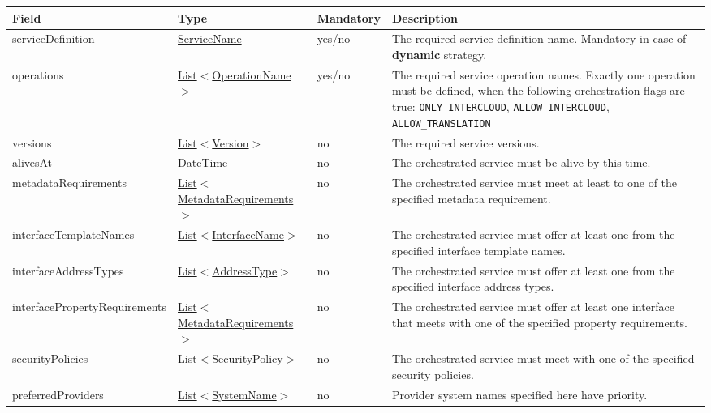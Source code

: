 \documentclass[a4paper]{arrowhead}
\newcommand{\pref}[1]{{\textcolor{ArrowheadGrey}{\hyperref[sec:model:primitives:#1]{#1}}}}
\begin{document}
\begin{table}[ht!]
\begin{tabularx}{\textwidth}{| p{4.8cm} | p{4.7cm} | p{2cm} | X |} \hline
\rowcolor{gray!33} Field & Type & Mandatory & Description \\ \hline
serviceDefinition & \pref{ServiceName} & yes/no & The required service definition name. Mandatory in case of \textbf{dynamic} strategy. \\ \hline
operations & \pref{List}$<$\pref{OperationName}$>$ & yes/no & The required service operation names. \newline 
Exactly one operation must be defined, when the following orchestration flags are true: \newline \texttt{ONLY\_INTERCLOUD}, \texttt{ALLOW\_INTERCLOUD}, \texttt{ALLOW\_TRANSLATION} \\ \hline
versions & \pref{List}$<$\pref{Version}$>$ & no & The required service versions. \\ \hline 
alivesAt & \pref{DateTime} & no & The orchestrated service must be alive by this time. \\ \hline
metadataRequirements & \pref{List}$<$\hyperref[sec:model:MetadataRequirements]{MetadataRequirements}$>$ & no & The orchestrated service must meet at least to one of the specified metadata requirement. \\ \hline
interfaceTemplateNames & \pref{List}$<$\pref{InterfaceName}$>$ & no & The orchestrated service must offer at least one from the specified interface template names. \\ \hline 
interfaceAddressTypes & \pref{List}$<$\pref{AddressType}$>$ & no & The orchestrated service must offer at least one from the specified interface address types. \\ \hline
interfacePropertyRequirements & \pref{List}$<$\hyperref[sec:model:MetadataRequirements]{MetadataRequirements}$>$ & no & The orchestrated service must offer at least one interface that meets with one of the specified property requirements. \\ \hline
securityPolicies & \pref{List}$<$\pref{SecurityPolicy}$>$ & no & The orchestrated service must meet with one of the specified security policies. \\ \hline
preferredProviders & \pref{List}$<$\pref{SystemName}$>$ & no & Provider system names specified here have priority. \\ \hline
\end{tabularx}
\end{table}
\end{document}
